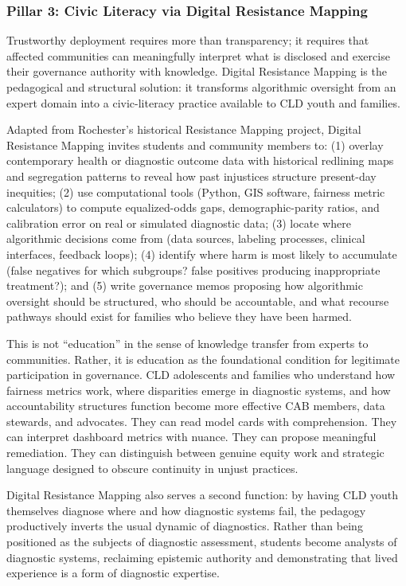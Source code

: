 \documentclass[12pt,letterpaper]{article}
\begin{document}
\subsubsection{Pillar 3: Civic Literacy via Digital Resistance Mapping}

Trustworthy deployment requires more than transparency; it requires that affected communities can meaningfully interpret what is disclosed and exercise their governance authority with knowledge.\cite{munn_idai700} Digital Resistance Mapping is the pedagogical and structural solution: it transforms algorithmic oversight from an expert domain into a civic-literacy practice available to CLD youth and families.\cite{garcia_ed415}

Adapted from Rochester's historical Resistance Mapping project, Digital Resistance Mapping invites students and community members to: (1) overlay contemporary health or diagnostic outcome data with historical redlining maps and segregation patterns to reveal how past injustices structure present-day inequities; (2) use computational tools (Python, GIS software, fairness metric calculators) to compute equalized-odds gaps, demographic-parity ratios, and calibration error on real or simulated diagnostic data; (3) locate where algorithmic decisions come from (data sources, labeling processes, clinical interfaces, feedback loops); (4) identify where harm is most likely to accumulate (false negatives for which subgroups? false positives producing inappropriate treatment?); and (5) write governance memos proposing how algorithmic oversight should be structured, who should be accountable, and what recourse pathways should exist for families who believe they have been harmed.\cite{garcia_ed415}

This is not ``education'' in the sense of knowledge transfer from experts to communities. Rather, it is education as the foundational condition for legitimate participation in governance. CLD adolescents and families who understand how fairness metrics work, where disparities emerge in diagnostic systems, and how accountability structures function become more effective CAB members, data stewards, and advocates. They can read model cards with comprehension. They can interpret dashboard metrics with nuance. They can propose meaningful remediation. They can distinguish between genuine equity work and strategic language designed to obscure continuity in unjust practices.\cite{munn_idai700}

Digital Resistance Mapping also serves a second function: by having CLD youth themselves diagnose where and how diagnostic systems fail, the pedagogy productively inverts the usual dynamic of diagnostics. Rather than being positioned as the subjects of diagnostic assessment, students become analysts of diagnostic systems, reclaiming epistemic authority and demonstrating that lived experience is a form of diagnostic expertise.\cite{garcia_ed415}
\end{document}
